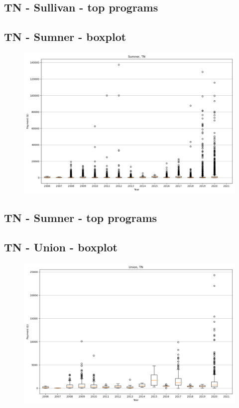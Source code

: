\subsection*{TN - Sullivan - top programs}

\newpage
\subsection*{TN - Sumner - boxplot}
\begin{figure}[h]
\centering
\includegraphics[width=7in]{../output/boxplots/counties/Sumner-TN_boxplot.png}
\end{figure}


\subsection*{TN - Sumner - top programs}

\newpage
\subsection*{TN - Union - boxplot}
\begin{figure}[h]
\centering
\includegraphics[width=7in]{../output/boxplots/counties/Union-TN_boxplot.png}
\end{figure}


